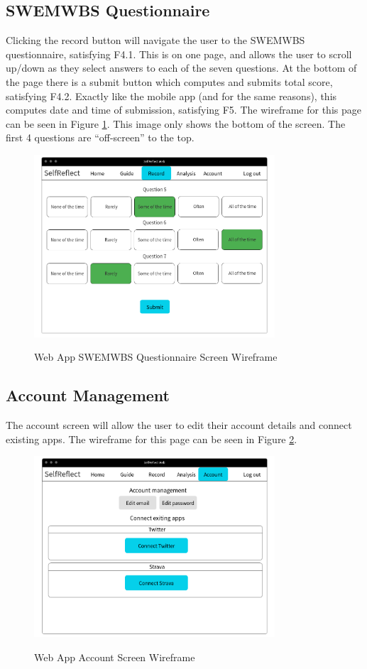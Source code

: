 \documentclass[11pt,openright,a4paper]{report}
\begin{document}
\subsection{SWEMWBS Questionnaire}
Clicking the record button will navigate the user to the SWEMWBS questionnaire, satisfying F4.1. This is on one page, and allows the user to scroll up/down as they select answers to each of the seven questions. At the bottom of the page there is a submit button which computes and submits total score, satisfying F4.2. Exactly like the mobile app (and for the same reasons), this computes date and time of submission, satisfying F5. The wireframe for this page can be seen in Figure \ref{fig:webrecord}. This image only shows the bottom of the screen. The first 4 questions are \enquote{off-screen} to the top.

\begin{figure}[ht]
\centering
\caption{Web App SWEMWBS Questionnaire Screen Wireframe}
\includegraphics[width=0.8\textwidth]{i/webrecord.png}
\label{fig:webrecord}
\end{figure}

\subsection{Account Management}
The account screen will allow the user to edit their account details and connect existing apps. The wireframe for this page can be seen in Figure \ref{fig:webaccount}.

\begin{figure}[ht]
\centering
\caption{Web App Account Screen Wireframe}
\includegraphics[width=0.8\textwidth]{i/webaccount.png}
\label{fig:webaccount}
\end{figure}
\end{document}
